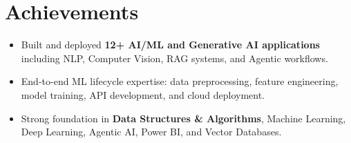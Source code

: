 \documentclass[a4paper,9pt]{article}
\newcommand{\resumeItem}[1]{\item\small #1}
\begin{document}
\vspace{-2mm}

\section{Achievements}
\begin{itemize}
\resumeItem{Built and deployed \textbf{12+ AI/ML and Generative AI applications} including NLP, Computer Vision, RAG systems, and Agentic workflows.}
\resumeItem{End-to-end ML lifecycle expertise: data preprocessing, feature engineering, model training, API development, and cloud deployment.}
\resumeItem{Strong foundation in \textbf{Data Structures \& Algorithms}, Machine Learning, Deep Learning, Agentic AI, Power BI, and Vector Databases.}
\end{itemize}
\end{document}
